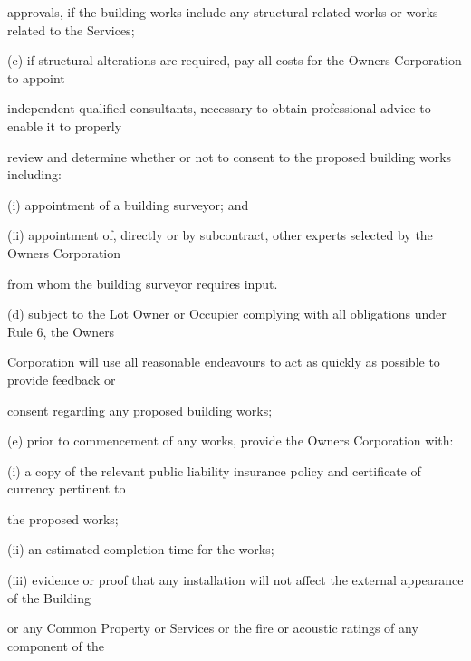 \documentclass{article}
\begin{document}
{\fontsize{10.02}{1}approvals, if the building works include any structural related works or works related to the Services; }

{\fontsize{9.962}{1}(c) if structural alterations are required, pay all costs for the Owners Corporation to appoint }

{\fontsize{10.02}{1}independent qualified consultants, necessary to obtain professional advice to enable it to properly }

{\fontsize{10.02}{1}review and determine whether or not to consent to the proposed building works including: }

{\fontsize{9.962}{1}(i) appointment of a building surveyor; and }

{\fontsize{9.962}{1}(ii) appointment of, directly or by subcontract, other experts selected by the Owners Corporation }

{\fontsize{10.02}{1}from whom the building surveyor requires input. }

{\fontsize{9.962}{1}(d) subject to the Lot Owner or Occupier complying with all obligations under Rule 6, the Owners }

{\fontsize{10.02}{1}Corporation will use all reasonable endeavours to act as quickly as possible to provide feedback or }

{\fontsize{10.02}{1}consent regarding any proposed building works; }

{\fontsize{9.962}{1}(e) prior to commencement of any works, provide the Owners Corporation with: }

{\fontsize{9.962}{1}(i) a copy of the relevant public liability insurance policy and certificate of currency pertinent to }

{\fontsize{10.02}{1}the proposed works; }

{\fontsize{9.962}{1}(ii) an estimated completion time for the works; }

{\fontsize{9.962}{1}(iii) evidence or proof that any installation will not affect the external appearance of the Building }

{\fontsize{10.02}{1}or any Common Property or Services or the fire or acoustic ratings of any component of the }

\newpage
\end{document}
